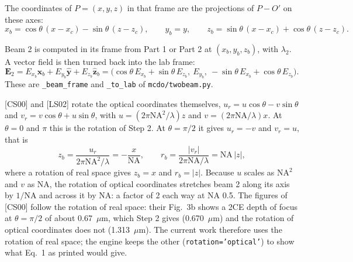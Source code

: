 \documentclass[11pt]{article}
\begin{document}
 The coordinates of $P = (x, y, z)$ in that frame are the projections of $P - O'$ on these axes:
\begin{equation}x_b = \cos\theta\,(x - x_c) - \sin\theta\,(z - z_c),\qquad y_b = y,\qquad
z_b = \sin\theta\,(x - x_c) + \cos\theta\,(z - z_c) .\end{equation}

 Beam 2 is computed in its frame from Part 1 or Part 2 at $(x_b, y_b, z_b)$, with $\lambda_2$. A vector field is
then turned back into the lab frame:
\begin{equation}\mathbf E_2 = E_{x_b}\hat{\mathbf x}_b + E_{y_b}\hat{\mathbf y} + E_{z_b}\hat{\mathbf z}_b
= \big(\cos\theta\,E_{x_b} + \sin\theta\,E_{z_b},\ E_{y_b},\ -\sin\theta\,E_{x_b} + \cos\theta\,E_{z_b}\big) .\end{equation}
These are \texttt{\_beam\_frame} and \texttt{\_to\_lab} of \texttt{mcdo/twobeam.py}.


 [CS00] and [LS02] rotate the optical coordinates themselves,
$u_r = u\cos\theta - v\sin\theta$ and $v_r = v\cos\theta + u\sin\theta$, with $u = (2\pi\mathrm{NA}^2/\lambda)z$ and
$v = (2\pi\mathrm{NA}/\lambda)x$. At $\theta = 0$ and $\pi$ this is the rotation of Step 2. At $\theta = \pi/2$ it gives
$u_r = -v$ and $v_r = u$, that is
\begin{equation}z_b = \frac{u_r}{2\pi\mathrm{NA}^2/\lambda} = -\frac{x}{\mathrm{NA}},\qquad
r_b = \frac{|v_r|}{2\pi\mathrm{NA}/\lambda} = \mathrm{NA}\,|z| ,\end{equation}
where a rotation of real space gives $z_b = x$ and $r_b = |z|$. Because $u$ scales as $\mathrm{NA}^2$ and $v$ as
NA, the rotation of optical coordinates stretches beam 2 along its axis by $1/\mathrm{NA}$ and across it by NA: a
factor of 2 each way at NA 0.5. The figures of [CS00] follow the rotation of real space: their Fig.~3b shows a 2CE
depth of focus at $\theta = \pi/2$ of about 0.67~$\mu$m, which Step 2 gives (0.670~$\mu$m) and the rotation of optical
coordinates does not (1.313~$\mu$m). The current work therefore uses the rotation of real space; the engine keeps the
other (\texttt{rotation='optical'}) to show what Eq.~1 as printed would give.
\end{document}
